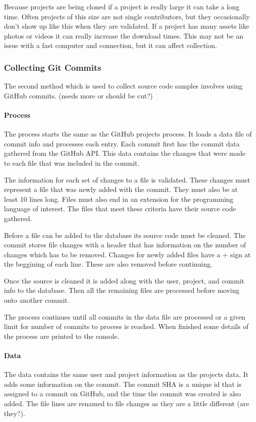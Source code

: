 \documentclass{article}
\begin{document}
Because projects are being cloned if a project is really large it can take a long time. Often projects of this size are not single contributors, but they occasionally don't show up like this when they are validated. If a project has many assets like photos or videos it can really increase the download times. This may not be an issue with a fast computer and connection, but it can affect collection.


\subsubsection{Collecting Git Commits}
The second method which is used to collect source code samples involves using GitHub commits. (needs more or should be cut?)

\paragraph{Process}
The process starts the same as the GitHub projects process. It loads a data file of commit info and processes each entry. Each commit first has the commit data gathered from the GitHub API. This data contains the changes that were made to each file that was included in the commit.

The information for each set of changes to a file is validated. These changes must represent a file that was newly added with the commit. They must also be at least 10 lines long. Files must also end in an extension for the programming language of interest. The files that meet these criteria have their source code gathered.

Before a file can be added to the database its source code must be cleaned. The commit stores file changes with a header that has information on the number of changes which has to be removed. Changes for newly added files have a + sign at the beggining of each line. These are also removed before continuing.

Once the source is cleaned it is added along with the user, project, and commit info to the database. Then all the remaining files are processed before moving onto another commit.

The process continues until all commits in the data file are processed or a given limit for number of commits to process is reached. When finished some details of the process are printed to the console.

\paragraph{Data}
The data contains the same user and project information as the projects data. It adds some information on the commit. The commit SHA is a unique id that is assigned to a commit on GitHub, and the time the commit was created is also added. The file lines are renamed to file changes as they are a little different (are they?).
\end{document}
